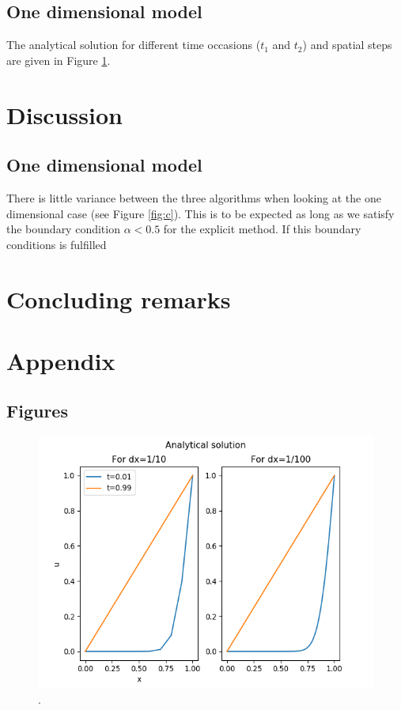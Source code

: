 \documentclass{article}
\begin{document}
\begin{multicols}{2}
\subsection{One dimensional model}

The analytical solution for different time occasions ($t_1$ and $t_2$) and spatial steps are given in Figure \ref{fig:b}. 

\section{Discussion}

\subsection{One dimensional model}

There is little variance between the three algorithms when looking at the one dimensional case (see Figure \ref{fig:c}). This is to be expected as long as we satisfy the boundary condition $\alpha<0.5$ for the explicit method. If this boundary conditions is fulfilled 

\section{Concluding remarks}




\end{multicols}

\clearpage

\appendix %

\section{Appendix}

\subsection{Figures}

\begin{figure}[H]
	\centering
	\includegraphics[width=120mm]{b.png}
	\caption{.}
	\label{fig:b}
\end{figure}
\end{document}
